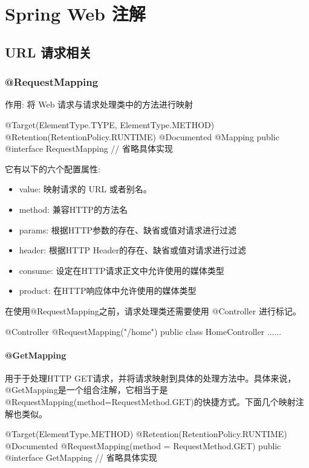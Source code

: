 \section{Spring Web 注解}

\subsection{URL 请求相关}

\subsubsection{@RequestMapping}

作用: 将 Web 请求与请求处理类中的方法进行映射

\begin{Java}
@Target({ElementType.TYPE, ElementType.METHOD})
@Retention(RetentionPolicy.RUNTIME)
@Documented
@Mapping
public @interface RequestMapping {
    // 省略具体实现
}
\end{Java}

它有以下的六个配置属性:
\begin{itemize}
    \item value: 映射请求的 URL 或者别名。
    \item method: 兼容HTTP的方法名
    \item params: 根据HTTP参数的存在、缺省或值对请求进行过滤
    \item header: 根据HTTP Header的存在、缺省或值对请求进行过滤
    \item consume: 设定在HTTP请求正文中允许使用的媒体类型
    \item product: 在HTTP响应体中允许使用的媒体类型
\end{itemize}

在使用@RequestMapping之前，请求处理类还需要使用 @Controller 进行标记。

\begin{Java}
@Controller
@RequestMapping("/home")
public class HomeController {
    ......
}
\end{Java}

\paragraph*{@GetMapping}

用于于处理HTTP GET请求，并将请求映射到具体的处理方法中。具体来说，@GetMapping是一个组合注解，它相当于是@RequestMapping(method=RequestMethod.GET)的快捷方式。下面几个映射注解也类似。

\begin{Java}
@Target(ElementType.METHOD)
@Retention(RetentionPolicy.RUNTIME)
@Documented
@RequestMapping(method = RequestMethod.GET)
public @interface GetMapping {
    // 省略具体实现
}
\end{Java}

